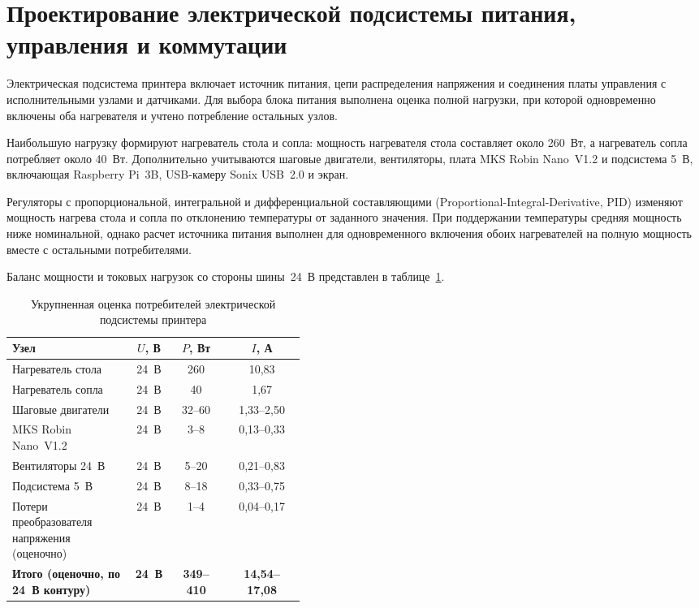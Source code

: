 \section{Проектирование электрической подсистемы питания, управления и коммутации}

Электрическая подсистема принтера включает источник питания, цепи распределения напряжения и соединения платы управления с исполнительными узлами и датчиками. Для выбора блока питания выполнена оценка полной нагрузки, при которой одновременно включены оба нагревателя и учтено потребление остальных узлов.

Наибольшую нагрузку формируют нагреватель стола и сопла: мощность нагревателя стола составляет около 260~Вт, а нагреватель сопла потребляет около 40~Вт. Дополнительно учитываются шаговые двигатели, вентиляторы, плата MKS Robin Nano~V1.2 и подсистема 5~В, включающая Raspberry Pi~3B, USB-камеру Sonix USB~2.0 и экран.

Регуляторы с пропорциональной, интегральной и дифференциальной составляющими (Proportional-Integral-Derivative, PID) изменяют мощность нагрева стола и сопла по отклонению температуры от заданного значения. При поддержании температуры средняя мощность ниже номинальной, однако расчет источника питания выполнен для одновременного включения обоих нагревателей на полную мощность вместе с остальными потребителями.

Баланс мощности и токовых нагрузок со стороны шины~24~В представлен в таблице~\ref{table:power_consumers}.

\begin{table}[h!]
\caption{Укрупненная оценка потребителей электрической подсистемы принтера}
\label{table:power_consumers}
\small
\renewcommand{\arraystretch}{1.2}
\begin{tabular}{|p{0.42\linewidth}|c|c|c|}
\hline
\textbf{Узел} & \textbf{\(U\), В} & \textbf{\(P\), Вт} & \textbf{\(I\), А} \tabularnewline
\hline
Нагреватель стола & 24~В & 260 & 10,83 \tabularnewline
\hline
Нагреватель сопла & 24~В & 40 & 1,67 \tabularnewline
\hline
Шаговые двигатели & 24~В & 32--60 & 1,33--2,50 \tabularnewline
\hline
MKS Robin Nano~V1.2 & 24~В & 3--8 & 0,13--0,33 \tabularnewline
\hline
Вентиляторы 24~В & 24~В & 5--20 & 0,21--0,83 \tabularnewline
\hline
Подсистема 5~В & 24~В & 8--18 & 0,33--0,75 \tabularnewline
\hline
Потери преобразователя напряжения (оценочно) & 24~В & 1--4 & 0,04--0,17 \tabularnewline
\hline
\textbf{Итого (оценочно, по 24~В контуру)} & \textbf{24~В} & \textbf{349--410} & \textbf{14,54--17,08} \tabularnewline
\hline
\end{tabular}
\end{table}

